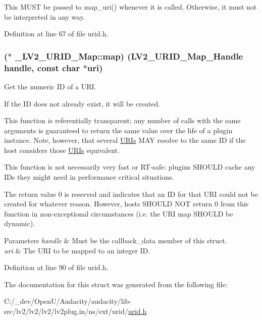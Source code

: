 This M\+U\+ST be passed to map\+\_\+uri() whenever it is called. Otherwise, it must not be interpreted in any way. 

Definition at line 67 of file urid.\+h.

\subsubsection[{\texorpdfstring{map}{map}}]{($\ast$ \+\_\+\+L\+V2\+\_\+\+U\+R\+I\+D\+\_\+\+Map\+::map) ({\bf L\+V2\+\_\+\+U\+R\+I\+D\+\_\+\+Map\+\_\+\+Handle} {\bf handle}, {\bf const} char $\ast${\bf uri})}\hypertarget{struct___l_v2___u_r_i_d___map_a560d625bc0aacd00fd8e6e1e2915bf1a}{}\label{struct___l_v2___u_r_i_d___map_a560d625bc0aacd00fd8e6e1e2915bf1a}
Get the numeric ID of a U\+RI.

If the ID does not already exist, it will be created.

This function is referentially transparent; any number of calls with the same arguments is guaranteed to return the same value over the life of a plugin instance. Note, however, that several \hyperlink{struct_u_r_is}{U\+R\+Is} M\+AY resolve to the same ID if the host considers those \hyperlink{struct_u_r_is}{U\+R\+Is} equivalent.

This function is not necessarily very fast or R\+T-\/safe\+: plugins S\+H\+O\+U\+LD cache any I\+Ds they might need in performance critical situations.

The return value 0 is reserved and indicates that an ID for that U\+RI could not be created for whatever reason. However, hosts S\+H\+O\+U\+LD N\+OT return 0 from this function in non-\/exceptional circumstances (i.\+e. the U\+RI map S\+H\+O\+U\+LD be dynamic).


\begin{DoxyParams}{Parameters}
{\em handle} & Must be the callback\+\_\+data member of this struct. \\
\hline
{\em uri} & The U\+RI to be mapped to an integer ID. \\
\hline
\end{DoxyParams}


Definition at line 90 of file urid.\+h.



The documentation for this struct was generated from the following file\+:\begin{DoxyCompactItemize}
\item 
C\+:/\+\_\+dev/\+Open\+U/\+Audacity/audacity/lib-\/src/lv2/lv2/lv2/lv2plug.\+in/ns/ext/urid/\hyperlink{urid_8h}{urid.\+h}\end{DoxyCompactItemize}
